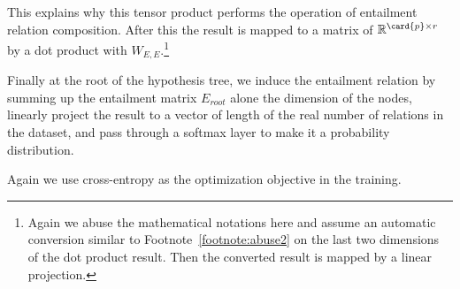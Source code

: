 This explains why this tensor product performs 
the operation of entailment relation composition.
After this the result is mapped to a matrix
of $\mathbb{R}^{\card{p}\times r}$ by a dot product
with $W_{E,E}$.\footnote{
Again we abuse the mathematical notations here and assume an
automatic conversion similar to Footnote~\ref{footnote:abuse2}
on the last two dimensions of the dot product result.
Then the converted result is mapped 
by a linear projection.
}

Finally at the root of the hypothesis tree, 
we induce the entailment relation by 
summing up the entailment matrix $E_{root}$
alone the dimension of the nodes,
linearly project the result to a vector of
length of the real number of relations in the dataset,
and pass through a softmax layer to make it a probability
distribution.

Again we use cross-entropy as the optimization objective in the training.

